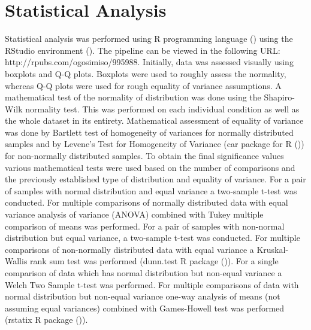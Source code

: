 \section{Statistical Analysis} \label{Statistical Analysis}
Statistical analysis was performed using R programming language (\cite{RCoreTeam2022R:Computing}) using the RStudio environment (\cite{RStudioTeam2022RStudio:RStudio}). The pipeline can be viewed in the following URL: http://rpubs.com/ogosimiso/995988. Initially, data was assessed visually using boxplots and Q-Q plots. Boxplots were used to roughly assess the normality, whereas Q-Q plots were used for rough equality of variance assumptions. A mathematical test of the normality of distribution was done using the Shapiro-Wilk normality test. This was performed on each individual condition as well as the whole dataset in its entirety. Mathematical assessment of equality of variance was done by Bartlett test of homogeneity of variances for normally distributed samples and by Levene's Test for Homogeneity of Variance (car package for R (\cite{Fox2019AnRegression})) for non-normally distributed samples. To obtain the final significance values various mathematical tests were used based on the number of comparisons and the previously established type of distribution and equality of variance. For a pair of samples with normal distribution and equal variance a two-sample t-test was conducted. For multiple comparisons of normally distributed data with equal variance analysis of variance (ANOVA) combined with Tukey multiple comparison of means was performed. For a pair of samples with non-normal distribution but equal variance, a two-sample t-test was conducted. For multiple comparisons of non-normally distributed data with equal variance a Kruskal-Wallis rank sum test was performed (dunn.test R package (\cite{Dinno2017Dunn.test:Sums})). For a single comparison of data which has normal distribution but non-equal variance a Welch Two Sample t-test was performed. For multiple comparisons of data with normal distribution but non-equal variance one-way analysis of means (not assuming equal variances) combined with Games-Howell test was performed (rstatix R package (\cite{Kassambara2022Rstatix:Tests})). 

